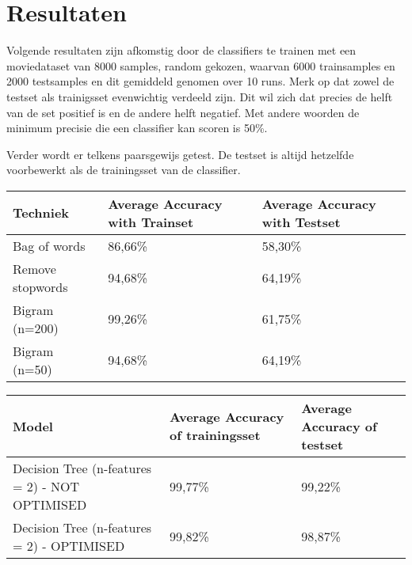 \section{Resultaten}\label{Resultaten}

Volgende resultaten zijn afkomstig door de classifiers te trainen met een moviedataset van 8000 samples, random gekozen, waarvan 6000 trainsamples en 2000 testsamples en dit gemiddeld genomen over 10 runs.
Merk op dat zowel de testset als trainigsset evenwichtig verdeeld zijn.  Dit wil zich dat precies de helft van de set positief is en de andere helft negatief. Met andere woorden de minimum precisie die een classifier kan scoren is 50\%.

Verder wordt er telkens paarsgewijs getest. De testset is altijd hetzelfde voorbewerkt als de trainingsset van de classifier.

\begin{table}[h]
\begin{tabular}{lll}
\hline
Techniek         & Average Accuracy with Trainset & Average Accuracy with Testset \\    \hline
Bag of words     & 86,66\%                        & 58,30\%                       \\    \hline
Remove stopwords & 94,68\%                        & 64,19\%                       \\    \hline
Bigram (n=200)   & 99,26\%                        & 61,75\%                       \\    \hline
Bigram (n=50)    & 94,68\%                        & 64,19\%                        \\   \hline
\end{tabular}
\end{table}

\begin{table}[h]
\begin{tabular}{lll}
\hline
Model                                          & Average Accuracy of trainingsset & Average Accuracy of testset \\  \hline
Decision Tree (n-features = 2) - NOT OPTIMISED & 99,77\%                          & 99,22\%                     \\  \hline
Decision Tree (n-features = 2) - OPTIMISED     & 99,82\%                          & 98,87\%                     \\ \hline
\end{tabular}
\end{table}

